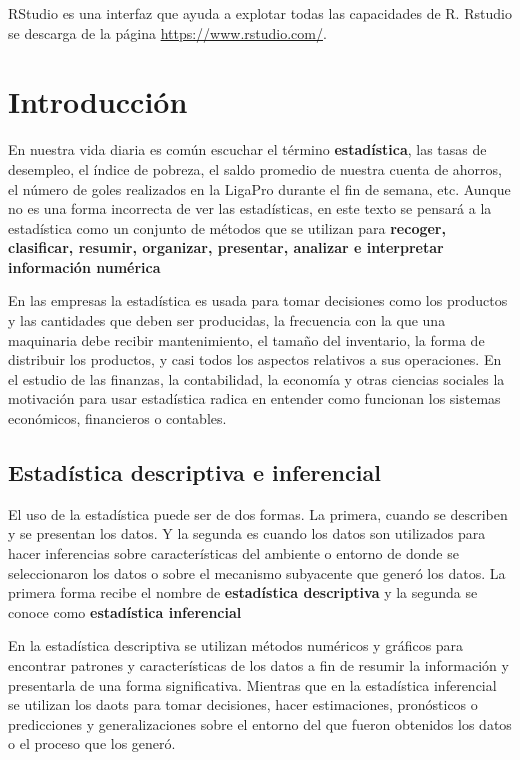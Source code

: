 \documentclass[]{book}
\begin{document}
RStudio es una interfaz que ayuda a explotar todas las capacidades de R.
Rstudio se descarga de la página \url{https://www.rstudio.com/}.

\chapter{Introducción}\label{intro}

En nuestra vida diaria es común escuchar el término
\textbf{estadística}, las tasas de desempleo, el índice de pobreza, el
saldo promedio de nuestra cuenta de ahorros, el número de goles
realizados en la LigaPro durante el fin de semana, etc. Aunque no es una
forma incorrecta de ver las estadísticas, en este texto se pensará a la
estadística como un conjunto de métodos que se utilizan para
\textbf{recoger, clasificar, resumir, organizar, presentar, analizar e
interpretar información numérica}

En las empresas la estadística es usada para tomar decisiones como los
productos y las cantidades que deben ser producidas, la frecuencia con
la que una maquinaria debe recibir mantenimiento, el tamaño del
inventario, la forma de distribuir los productos, y casi todos los
aspectos relativos a sus operaciones. En el estudio de las finanzas, la
contabilidad, la economía y otras ciencias sociales la motivación para
usar estadística radica en entender como funcionan los sistemas
económicos, financieros o contables.

\section{Estadística descriptiva e inferencial}\label{estypes}

El uso de la estadística puede ser de dos formas. La primera, cuando se
describen y se presentan los datos. Y la segunda es cuando los datos son
utilizados para hacer inferencias sobre características del ambiente o
entorno de donde se seleccionaron los datos o sobre el mecanismo
subyacente que generó los datos. La primera forma recibe el nombre de
\textbf{estadística descriptiva} y la segunda se conoce como
\textbf{estadística inferencial}

En la estadística descriptiva se utilizan métodos numéricos y gráficos
para encontrar patrones y características de los datos a fin de resumir
la información y presentarla de una forma significativa. Mientras que en
la estadística inferencial se utilizan los daots para tomar decisiones,
hacer estimaciones, pronósticos o predicciones y generalizaciones sobre
el entorno del que fueron obtenidos los datos o el proceso que los
generó.
\end{document}
